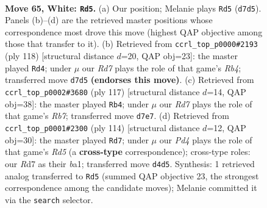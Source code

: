 \documentclass[11pt]{article}
\begin{document}
\clearpage

\begin{figure}[p]\centering
\begin{subfigure}{0.46\textwidth}\centering
\resizebox{\linewidth}{!}{%
\newchessgame
\chessboard[
  setfen={8/3R2p1/5pk1/N6p/3P3P/r5PK/8/8 w - - 23 65},
  showmover=false,
  pgfstyle=straightmove, color=movearrow, markmove={d7-d5}
]}
\caption{}
\end{subfigure}\hfill
\begin{subfigure}{0.46\textwidth}\centering
\resizebox{\linewidth}{!}{%
\newchessgame
\chessboard[
  setfen={8/8/5pp1/5k1p/1R5P/6P1/r4PK1/8 w - - 10 60},
  showmover=false,
  pgfstyle=straightmove, color=movearrow, markmove={b4-d4}
]}
\caption{}
\end{subfigure}
\\[4pt]
\begin{subfigure}{0.46\textwidth}\centering
\resizebox{\linewidth}{!}{%
\newchessgame
\chessboard[
  setfen={8/8/R5pk/7p/7P/5PK1/1r4P1/8 b - - 26 59},
  showmover=false,
  pgfstyle=straightmove, color=movearrow, markmove={b2-b4}
]}
\caption{}
\end{subfigure}\hfill
\begin{subfigure}{0.46\textwidth}\centering
\resizebox{\linewidth}{!}{%
\newchessgame
\chessboard[
  setfen={8/7p/6pk/3R1p2/7P/3Nr1PK/8/b7 w - - 25 58},
  showmover=false,
  pgfstyle=straightmove, color=movearrow, markmove={d5-d7}
]}
\caption{}
\end{subfigure}
\caption{\textbf{Move 65, White: \texttt{Rd5}.} (a) Our position; Melanie plays \texttt{Rd5} (\texttt{d7d5}). Panels (b)--(d) are the retrieved master positions whose correspondence most drove this move (highest QAP objective among those that transfer to it). (b) Retrieved from \texttt{ccrl\_top\_p0000\#2193} (ply 118) [structural distance $d$=20, QAP obj=23]: the master played \texttt{Rd4}; under $\mu$ our \emph{Rd7} plays the role of that game's \emph{Rb4}; transferred move \texttt{d7d5} \textbf{(endorses this move)}. (c) Retrieved from \texttt{ccrl\_top\_p0002\#3680} (ply 117) [structural distance $d$=14, QAP obj=38]: the master played \texttt{Rb4}; under $\mu$ our \emph{Rd7} plays the role of that game's \emph{Rb7}; transferred move \texttt{d7e7}. (d) Retrieved from \texttt{ccrl\_top\_p0001\#2300} (ply 114) [structural distance $d$=12, QAP obj=30]: the master played \texttt{Rd7}; under $\mu$ our \emph{Pd4} plays the role of that game's \emph{Rd5} (a \textbf{cross-type} correspondence); cross-type roles: our \emph{R}d7 as their \emph{b}a1; transferred move \texttt{d4d5}. Synthesis: 1 retrieved analog transferred to \texttt{Rd5} (summed QAP objective 23, the strongest correspondence among the candidate moves); Melanie committed it via the \texttt{search} selector.}
\label{fig:thought-m128}
\end{figure}
\end{document}
